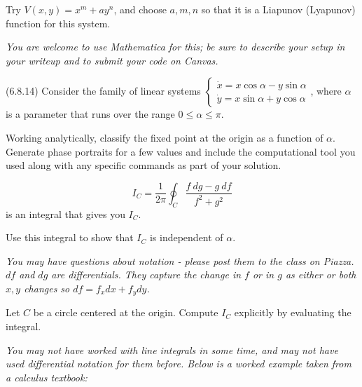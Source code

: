 \documentclass[12pt,letterpaper,noanswers]{exam}
\begin{document}
\begin{questions}
Try $V(x,y) = x^m + a y^n$, and choose $a, m, n$ so that it is a Liapunov (Lyapunov) function for this system.




\emph{You are welcome to use Mathematica for this; be sure to describe your setup in your writeup and to submit your code on Canvas.}




\question  (6.8.14) Consider the family of linear systems $\left\{\begin{array}{c} \dot{x} = x\cos\alpha - y\sin\alpha \\ \dot{y} = x\sin\alpha + y\cos\alpha\end{array}\right.$, where $\alpha$ is a parameter that runs over the range $0\leq \alpha\leq \pi$.



\begin{parts}
\item Working analytically, classify the fixed point at the origin as a function of $\alpha$.  Generate phase portraits for a few values and include the computational tool you used along with any specific commands as part of your solution.  



\item \[I_C = \frac{1}{2\pi}\oint_C \frac{f\ dg - g\ df}{f^2+g^2}\] is an integral that gives you $I_C$.  

Use this integral to show that $I_C$ is independent of $\alpha$. %

\emph{You may have questions about notation - please post them to the class on Piazza.  $df$ and $dg$ are differentials.  They capture the change in $f$ or in $g$ as either or both $x, y$ changes so $df = f_x dx + f_y dy$.}



\item Let $C$ be a circle centered at the origin.  Compute $I_C$ explicitly by evaluating the integral.


\emph{You may not have worked with line integrals in some time, and may not have used differential notation for them before.  Below is a worked example taken from a calculus textbook:}


\end{parts}
\end{questions}
\end{document}

